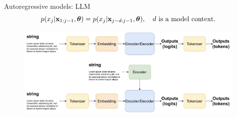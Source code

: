 \begin{frame}{Autoregressive models: LLM}
	\[
		p(x_j | \mathbf{x}_{1:j - 1}, \boldsymbol{\theta}) = p(x_j | \mathbf{x}_{j - d:j - 1}, \boldsymbol{\theta}), \quad d \text{ is a model context}.
	\]
	 \begin{figure}
		   \centering
		   \includegraphics[width=1.0\linewidth]{figs/llm_modeling}
	 \end{figure}
\end{frame}
